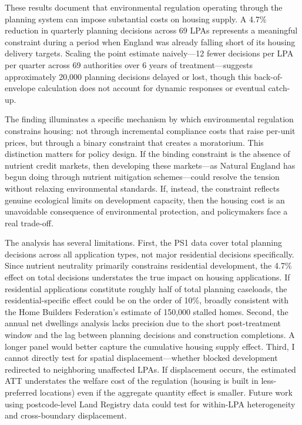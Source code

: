 \documentclass[12pt]{article}
\begin{document}
These results document that environmental regulation operating through the planning system can impose substantial costs on housing supply. A 4.7\% reduction in quarterly planning decisions across 69 LPAs represents a meaningful constraint during a period when England was already falling short of its housing delivery targets. Scaling the point estimate naively---12 fewer decisions per LPA per quarter across 69 authorities over 6 years of treatment---suggests approximately 20,000 planning decisions delayed or lost, though this back-of-envelope calculation does not account for dynamic responses or eventual catch-up.

The finding illuminates a specific mechanism by which environmental regulation constrains housing: not through incremental compliance costs that raise per-unit prices, but through a binary constraint that creates a moratorium. This distinction matters for policy design. If the binding constraint is the absence of nutrient credit markets, then developing these markets---as Natural England has begun doing through nutrient mitigation schemes---could resolve the tension without relaxing environmental standards. If, instead, the constraint reflects genuine ecological limits on development capacity, then the housing cost is an unavoidable consequence of environmental protection, and policymakers face a real trade-off.

The analysis has several limitations. First, the PS1 data cover total planning decisions across all application types, not major residential decisions specifically. Since nutrient neutrality primarily constrains residential development, the 4.7\% effect on total decisions understates the true impact on housing applications. If residential applications constitute roughly half of total planning caseloads, the residential-specific effect could be on the order of 10\%, broadly consistent with the Home Builders Federation's estimate of 150,000 stalled homes. Second, the annual net dwellings analysis lacks precision due to the short post-treatment window and the lag between planning decisions and construction completions. A longer panel would better capture the cumulative housing supply effect. Third, I cannot directly test for spatial displacement---whether blocked development redirected to neighboring unaffected LPAs. If displacement occurs, the estimated ATT understates the welfare cost of the regulation (housing is built in less-preferred locations) even if the aggregate quantity effect is smaller. Future work using postcode-level Land Registry data could test for within-LPA heterogeneity and cross-boundary displacement.
\end{document}
